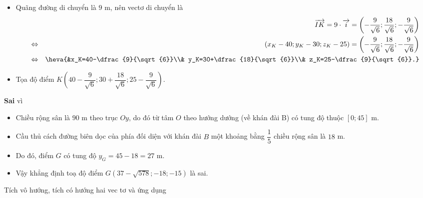\begin{ex}
{\begin{itemchoice}
\begin{itemize}
$$ 				$$
 				\item Quãng đường di chuyển là $9$ m, nên vectơ di chuyển là
 				\begin{eqnarray*}
 					&&\overrightarrow{IK} = 9 \cdot\overrightarrow{i} = \left( -\dfrac{9}{\sqrt{6}} ; \dfrac{18}{\sqrt{6}} ; -\dfrac{9}{\sqrt{6}} \right)\\
 					&\Leftrightarrow& \left(x_K-40;y_K-30;z_K-25\right)=\left( -\dfrac{9}{\sqrt{6}} ; \dfrac{18}{\sqrt{6}} ; -\dfrac{9}{\sqrt{6}} \right)\\
 					&\Leftrightarrow&\heva{&x_K=40-\dfrac{9}{\sqrt{6}}\\& y_K=30+\dfrac{18}{\sqrt{6}}\\& z_K=25-\dfrac{9}{\sqrt{6}}.}
 				\end{eqnarray*}
 				\item Tọa độ điểm $K\left(40-\dfrac{9}{\sqrt{6}};30+\dfrac{18}{\sqrt{6}};25-\dfrac{9}{\sqrt{6}}\right)$.
 			\end{itemize}
 			\itemch \textbf{Sai} vì\\
 			\begin{itemize}
 				\item Chiều rộng sân là $90$ m theo trục $Oy$, do đó từ tâm $O$ theo hướng dướng (về khán đài B) có tung độ thuộc $\left[0;45\right]$ m.
 				\item Cầu thủ cách đường biên dọc của phía đối diện với khán đài $B$ một khoảng bằng $\dfrac{1}{5}$ chiều rộng sân là $18$ m.
 				\item Do đó, điểm $G$ có tung độ $y_G=45-18=27$ m.
 				\item Vậy khẳng định toạ độ điểm $G\left(37-\sqrt{578};-18;-15\right)$ là sai.
 			\end{itemize}
 		\end{itemchoice}
 	}
 \end{ex}

\begin{dang}{Tích vô hướng, tích có hướng hai vec tơ và ứng dụng}
\end{dang}
\setcounter{vd}{0}

